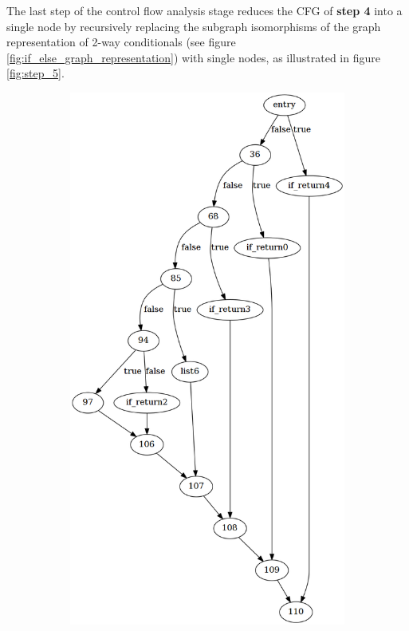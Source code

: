 The last step of the control flow analysis stage reduces the CFG of \textbf{step 4} into a single node by recursively replacing the subgraph isomorphisms of the graph representation of 2-way conditionals (see figure \ref{fig:if_else_graph_representation}) with single nodes, as illustrated in figure \ref{fig:step_5}.

\begin{figure}[htbp]
	\centering
	\begin{subfigure}[t]{0.45\textwidth}
		\includegraphics[width=\textwidth]{appendices/stmt_example/stmt_4.png}

\end{subfigure}
\end{figure}
